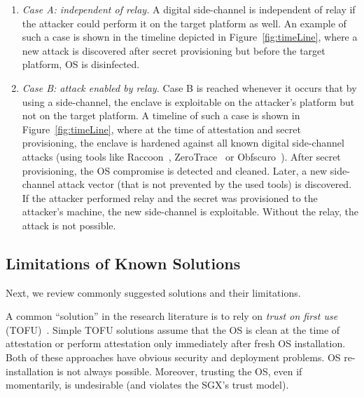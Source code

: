 \begin{enumerate}
    \item[]\emph{Case A: independent of relay.} A digital side-channel is independent of relay if the attacker could perform it on the target platform as well. An example of such a case is shown in the timeline depicted in Figure~\ref{fig:timeLine}, where a new attack is discovered after secret provisioning but before the target platform, OS is disinfected.
    

    \item[]\emph{Case B: attack enabled by relay.} Case B is reached whenever it occurs that by using a side-channel, the enclave is exploitable on the attacker's platform but not on the target platform. 
    A timeline of such a case is shown in Figure~\ref{fig:timeLine}, where at the time of attestation and secret provisioning, the enclave is hardened against all known digital side-channel attacks (using tools like Raccoon~\cite{raccoon}, ZeroTrace~\cite{zerotrace} or Obfscuro~\cite{obfscuro}). After secret provisioning, the OS compromise is detected and cleaned. Later, a new side-channel attack vector (that is not prevented by the used tools) is discovered. If the attacker performed relay and the secret was provisioned to the attacker's machine, the new side-channel is exploitable. Without the relay, the attack is not possible.
    

\end{enumerate}


\subsection{Limitations of Known Solutions}
\label{sec:problemStatement:limitations}

Next, we review commonly suggested solutions and their limitations.

A common ``solution'' in the research literature is to rely on \emph{trust on first use} (TOFU)~\cite{tofu}. Simple TOFU solutions assume that the OS is clean at the time of attestation or perform attestation only immediately after fresh OS installation. Both of these approaches have obvious security and deployment problems. OS re-installation is not always possible. Moreover, trusting the OS, even if momentarily, is undesirable (and violates the SGX's trust model).


